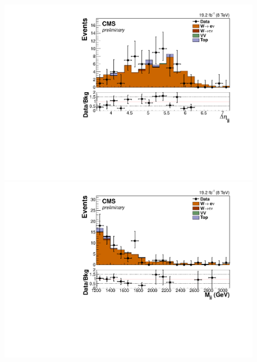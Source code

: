 \begin{figure}
  \includegraphics[width=.65\largefigwidth]{plots/parked/HIG-14-038-figs/output_sigreg/enu_dijet_deta.pdf}
  \includegraphics[width=.65\largefigwidth]{plots/parked/HIG-14-038-figs/output_sigreg/enu_dijet_M.pdf}


\end{figure}
